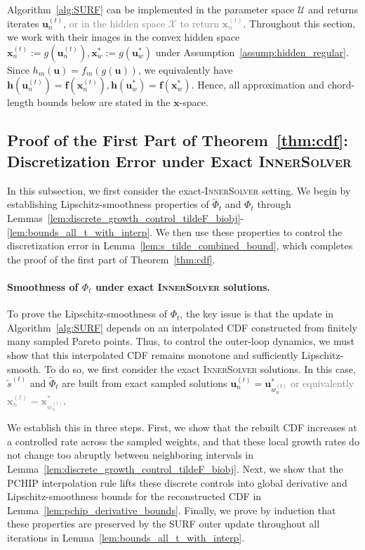 \documentclass{article}
\newcommand{\bx}{\mathbf{x}}
\newcommand{\bu}{\mathbf{u}}
\newcommand{\X}{\mathcal{X}}
\newcommand{\U}{\mathcal{U}}
\newcommand{\f}{\mathbf{f}}
\newcommand{\Farc}{\Phi}
\begin{document}
Algorithm~\ref{alg:SURF} can be implemented in the parameter space $\U$ and returns iterates
$\bu_n^{(t)}$, \textcolor{gray}{or in the hidden space $\X$ to return $\bx_{n}^{(t)}$}. Throughout this section, we work with their images in the convex hidden space $\bx_n^{(t)} := g(\bu_n^{(t)}), \bx_w^* := g(\bu_w^*)$ under Assumption~\ref{assump:hidden_regular}. Since $h_m(\bu)=f_m(g(\bu))$, we equivalently have $\mathbf h(\bu_n^{(t)})=\f(\bx_n^{(t)}),\mathbf h(\bu_w^*)=\f(\bx_w^*)$.
Hence, all approximation and chord-length bounds below are stated in the $\bx$-space.

\subsection{Proof of the First Part of Theorem~\ref{thm:cdf}: Discretization Error under Exact \textsc{InnerSolver}}
\label{appendix:Lipschitz-smoothness}
In this subsection, we first consider the exact-\textsc{InnerSolver} setting. We begin by establishing Lipschitz-smoothness properties of $\tilde\Farc_t$ and $\Farc_t$ through Lemmas~\ref{lem:discrete_growth_control_tildeF_biobj}-\ref{lem:bounds_all_t_with_interp}. We then use these properties to control the discretization error in Lemma~\ref{lem:s_tilde_combined_bound}, which completes the proof of the first part of Theorem~\ref{thm:cdf}.



\paragraph{Smoothness of $\Farc_t$ under exact \textsc{InnerSolver} solutions.}
To prove the Lipschitz-smoothness of $\Farc_t$, the key issue is that the update in Algorithm~\ref{alg:SURF} depends on an interpolated CDF constructed from finitely many sampled Pareto points. Thus, to control the outer-loop dynamics, we must show that this interpolated CDF remains monotone and sufficiently Lipschitz-smooth. To do so, we first consider the exact \textsc{InnerSolver} solutions. In this case, $\tilde s^{(t)}$ and $\tilde \Farc_t$ are built from exact sampled solutions $\bu_{n}^{(t)}=\bu^*_{w_n^{(t)}}$ \textcolor{gray}{or equivalently $\bx_{n}^{(t)}=\bx^*_{w_n^{(t)}}$}.

We establish this in three steps. First, we show that the rebuilt CDF increases at a controlled rate across the sampled weights, and that these local growth rates do not change too abruptly between neighboring intervals in Lemma~\ref{lem:discrete_growth_control_tildeF_biobj}. Next, we show that the PCHIP interpolation rule lifts these discrete controls into global derivative and Lipschitz-smoothness bounds for the reconstructed CDF in Lemma~\ref{lem:pchip_derivative_bounds}. Finally, we prove by induction that these properties are preserved by the SURF outer update throughout all iterations in Lemma~\ref{lem:bounds_all_t_with_interp}.
\end{document}
